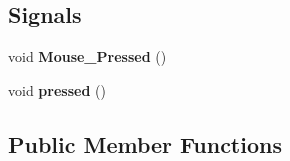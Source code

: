 \subsection*{Signals}
\begin{DoxyCompactItemize}
\item 
void {\bfseries Mouse\+\_\+\+Pressed} ()\hypertarget{class_map__traffic__large_aea320394297fd0e3c7feb1e4adc43d23}{}\label{class_map__traffic__large_aea320394297fd0e3c7feb1e4adc43d23}

\item 
void {\bfseries pressed} ()\hypertarget{class_map__traffic__large_af4aa0075fcd4fd70938846ec2b703154}{}\label{class_map__traffic__large_af4aa0075fcd4fd70938846ec2b703154}

\end{DoxyCompactItemize}
\subsection*{Public Member Functions}
